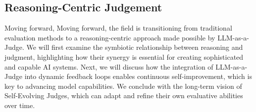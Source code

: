 


\subsection{Reasoning-Centric Judgement}\label{subsec:reasoning-centric}
Moving forward, Moving forward, the field is transitioning from traditional evaluation methods to a reasoning-centric approach made possible by LLM-as-a-Judge. We will first examine the symbiotic relationship between reasoning and judgment, highlighting how their synergy is essential for creating sophisticated and capable AI systems. Next, we will discuss how the integration of LLM-as-a-Judge into dynamic feedback loops enables continuous self-improvement, which is key to advancing model capabilities. We conclude with the long-term vision of Self-Evolving Judges, which can adapt and refine their own evaluative abilities over time.


